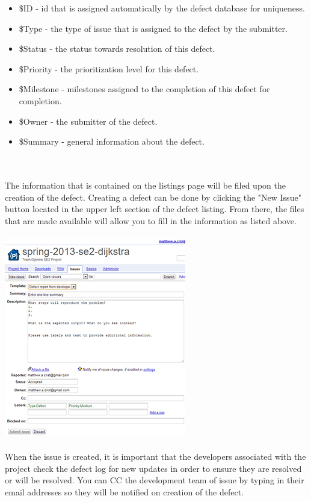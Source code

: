 \documentclass[11pt, letterpaper]{report}
\begin{document}
\begin{description}
\begin{itemize}
	\item \$ID - id that is assigned automatically by the defect database for uniqueness.
	\item \$Type - the type of issue that is assigned to the defect by the submitter.
	\item \$Status - the status towards resolution of this defect.
	\item \$Priority - the prioritization level for this defect.
	\item \$Milestone - milestones assigned to the completion of this defect for completion.
	\item \$Owner - the submitter of the defect.
	\item \$Summary - general information about the defect.
\end{itemize}
\hfill \\ \hfill \\
The information that is contained on the listings page will be filed upon the creation of the defect.  Creating a defect can be done by clicking the "New Issue" button located in the upper left section of the defect listing.  From there, the files that are made available will allow you to fill in the information as listed above.\hfill \\ \hfill \\
\includegraphics{defect_entry---defect-log} \hfill \\ \hfill \\
When the issue is created, it is important that the developers associated with the project check the defect log for new updates in order to ensure they are resolved or will be resolved.  You can CC the development team of issue by typing in their email addresses so they will be notified on creation of the defect.
\end{description}
\end{document}
